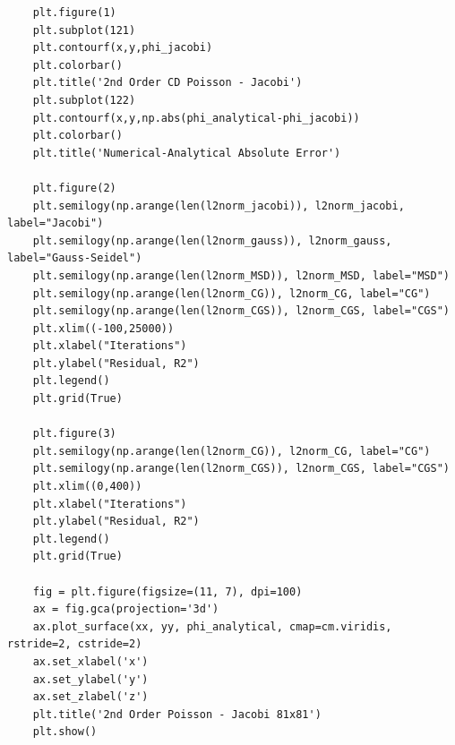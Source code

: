 \documentclass[11pt]{article}
\begin{document}
\begin{verbatim}
    plt.figure(1)
    plt.subplot(121)
    plt.contourf(x,y,phi_jacobi)
    plt.colorbar()
    plt.title('2nd Order CD Poisson - Jacobi')
    plt.subplot(122)
    plt.contourf(x,y,np.abs(phi_analytical-phi_jacobi))
    plt.colorbar()
    plt.title('Numerical-Analytical Absolute Error')

    plt.figure(2)
    plt.semilogy(np.arange(len(l2norm_jacobi)), l2norm_jacobi, label="Jacobi")
    plt.semilogy(np.arange(len(l2norm_gauss)), l2norm_gauss, label="Gauss-Seidel")
    plt.semilogy(np.arange(len(l2norm_MSD)), l2norm_MSD, label="MSD")
    plt.semilogy(np.arange(len(l2norm_CG)), l2norm_CG, label="CG")
    plt.semilogy(np.arange(len(l2norm_CGS)), l2norm_CGS, label="CGS")
    plt.xlim((-100,25000))
    plt.xlabel("Iterations")
    plt.ylabel("Residual, R2")
    plt.legend()
    plt.grid(True)

    plt.figure(3)
    plt.semilogy(np.arange(len(l2norm_CG)), l2norm_CG, label="CG")
    plt.semilogy(np.arange(len(l2norm_CGS)), l2norm_CGS, label="CGS")
    plt.xlim((0,400))
    plt.xlabel("Iterations")
    plt.ylabel("Residual, R2")
    plt.legend()
    plt.grid(True)

    fig = plt.figure(figsize=(11, 7), dpi=100)
    ax = fig.gca(projection='3d')
    ax.plot_surface(xx, yy, phi_analytical, cmap=cm.viridis, rstride=2, cstride=2)
    ax.set_xlabel('x')
    ax.set_ylabel('y')
    ax.set_zlabel('z')
    plt.title('2nd Order Poisson - Jacobi 81x81')
    plt.show()
\end{verbatim}
\end{document}

